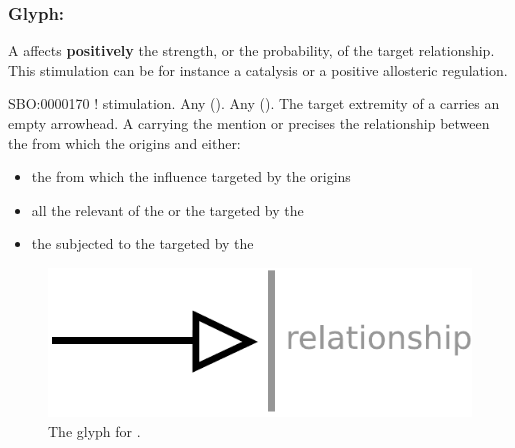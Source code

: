 
\subsubsection{Glyph: }\label{sec:stimulation}
\color{blue}

A  affects \textbf{positively} the strength, or the probability, of the target relationship. This stimulation can be for instance a catalysis or a positive allosteric regulation.

\begin{glyphDescription}
 \glyphSboTerm SBO:0000170 ! stimulation.
 \glyphOrigin Any  ().
 \glyphTarget Any  ().
 \glyphEndPoint The target extremity of a  carries an empty arrowhead.
 \glyphAux A  carrying the mention  or  precises the relationship between the  from which the  origins and either:
\begin{itemize}
\item the  from which the influence targeted by the  origins
\item all the relevant  of the  or the  targeted by the 
\item the  subjected to the  targeted by the 
\end{itemize}
 \end{glyphDescription}

\begin{figure}[H]
  \centering
  \includegraphics[scale = 0.5]{images/stimulation}
  \caption{The \PD glyph for .}
  \label{fig:stimulation}
\end{figure}

